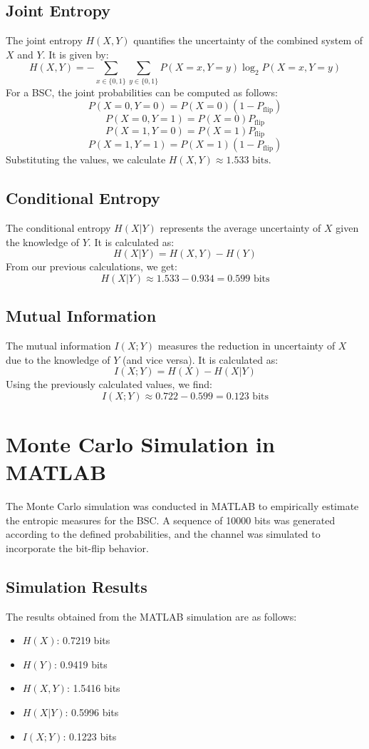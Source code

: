 \documentclass{article}
\begin{document}
\subsection{Joint Entropy}
The joint entropy \( H(X, Y) \) quantifies the uncertainty of the combined system of \( X \) and \( Y \). It is given by:
\[ H(X, Y) = -\sum_{x \in \{0,1\}} \sum_{y \in \{0,1\}} P(X=x, Y=y) \log_2 P(X=x, Y=y) \]
For a BSC, the joint probabilities can be computed as follows:
\[ P(X=0, Y=0) = P(X=0)(1 - P_{\text{flip}}) \]
\[ P(X=0, Y=1) = P(X=0)P_{\text{flip}} \]
\[ P(X=1, Y=0) = P(X=1)P_{\text{flip}} \]
\[ P(X=1, Y=1) = P(X=1)(1 - P_{\text{flip}}) \]
Substituting the values, we calculate \( H(X, Y) \approx 1.533 \text{ bits} \).

\subsection{Conditional Entropy}
The conditional entropy \( H(X|Y) \) represents the average uncertainty of \( X \) given the knowledge of \( Y \). It is calculated as:
\[ H(X|Y) = H(X, Y) - H(Y) \]
From our previous calculations, we get:
\[ H(X|Y) \approx 1.533 - 0.934 = 0.599 \text{ bits} \]

\subsection{Mutual Information}
The mutual information \( I(X; Y) \) measures the reduction in uncertainty of \( X \) due to the knowledge of \( Y \) (and vice versa). It is calculated as:
\[ I(X; Y) = H(X) - H(X|Y) \]
Using the previously calculated values, we find:
\[ I(X; Y) \approx 0.722 - 0.599 = 0.123 \text{ bits} \]

\section{Monte Carlo Simulation in MATLAB}
The Monte Carlo simulation was conducted in MATLAB to empirically estimate the entropic measures for the BSC. A sequence of 10000 bits was generated according to the defined probabilities, and the channel was simulated to incorporate the bit-flip behavior.

\subsection{Simulation Results}
The results obtained from the MATLAB simulation are as follows:
\begin{itemize}
    \item \(H(X)\): 0.7219 bits
    \item \(H(Y)\): 0.9419 bits
    \item \(H(X, Y)\): 1.5416 bits
    \item \(H(X|Y)\): 0.5996 bits
    \item \(I(X; Y)\): 0.1223 bits
\end{itemize}
\end{document}
